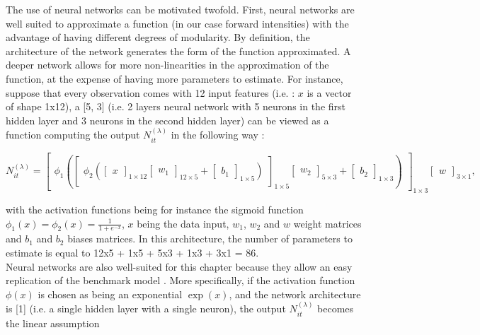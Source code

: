 The use of neural networks can be motivated twofold. First, neural networks are well suited to approximate a function (in our case forward intensities) with the advantage of having different degrees of modularity. By definition, the architecture of the network generates the form of the function approximated. A deeper network allows for more non-linearities in the approximation of the function, at the expense of having more parameters to estimate. For instance, suppose that every observation comes with 12 input features (i.e. : $x$ is a vector of shape 1x12), a [5, 3] (i.e. 2 layers neural network with 5 neurons in the first hidden layer and 3 neurons in the second hidden layer) can be viewed as a function computing the output $N_{it}^{(\lambda)}$ in the following way :


\begin{equation*}
N_{it}^{(\lambda)} =  \begin{bmatrix}
\phi_1 (\begin{bmatrix}
\phi_2 (\begin{bmatrix}
x
\end{bmatrix}_{1\times 12} 
\begin{bmatrix}
w_1
\end{bmatrix}_{12\times 5} + 
\begin{bmatrix}
b_1
\end{bmatrix}_{1\times 5})
\end{bmatrix}_{1 \times 5 } 
\begin{bmatrix}
w_2
\end{bmatrix}_{5 \times 3} + 
\begin{bmatrix}
b_2
\end{bmatrix}_{1 \times 3})
\end{bmatrix}_{1 \times 3} 
\begin{bmatrix}
w
\end{bmatrix}_{3 \times 1},
\end{equation*}


\noindent  with the activation functions being for instance the sigmoid function $\phi_1(x) = \phi_2(x) = \frac{1}{1+e^{-x}}$, $x$ being the data input, $w_1$, $w_2$ and $w$ weight matrices and $b_1$ and $b_2$ biases matrices. In this architecture, the number of parameters to estimate is equal to 12x5 + 1x5 + 5x3 + 1x3 + 3x1 = 86. \\
Neural networks are also well-suited for this chapter because they allow an easy replication of the benchmark model \citet{Duan2012}. More specifically, if the activation function $\phi(x)$ is chosen as being an exponential $\exp(x)$, and the network architecture is [1] (i.e. a single hidden layer with a single neuron), the output $N_{it}^{(\lambda)}$ becomes the linear assumption

